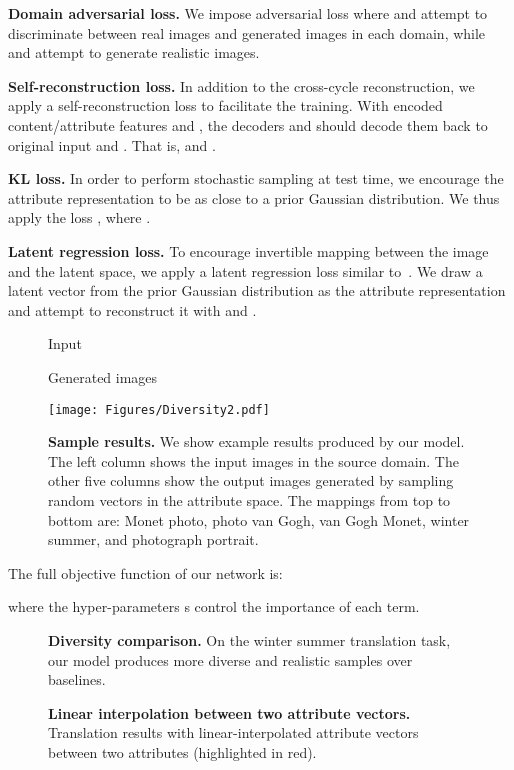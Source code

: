 \documentclass[runningheads]{llncs}
\newlength\figmargin
\newlength\secmargin
\newlength\eqmargin
\newcommand{\mpage}[2]
{
\begin{minipage}[t]{#1\linewidth}\centering
#2
\end{minipage}
}
\begin{document}
\noindent \textbf{Domain adversarial loss.}
We impose adversarial loss  where  and  attempt to discriminate between real images and generated images in each domain, while  and  attempt to generate realistic images.


\noindent \textbf{Self-reconstruction loss.}
In addition to the cross-cycle reconstruction, we apply a self-reconstruction loss  to facilitate the training. 
With encoded content/attribute features  and , the decoders  and  should decode them back to original input  and .
That is,  and .


\noindent \textbf{KL loss.}
In order to perform stochastic sampling at test time, we encourage the attribute representation to be as close to a prior Gaussian distribution.  
We thus apply the loss , where .

\noindent \textbf{Latent regression loss.}
To encourage invertible mapping between the image and the latent space, we apply a latent regression loss  similar to~\cite{zhu2017bicyclegan}. 
We draw a latent vector  from the prior Gaussian distribution as the attribute representation and attempt to reconstruct it with  and .


\begin{figure*}[t]
	\centering
     \mpage{0.16}{Input}\hfill\mpage{0.8}{Generated images}
\texttt{[image: Figures/Diversity2.pdf]}
\caption{\textbf{Sample results.} We show example results produced by our model. The left column shows the input images in the source domain. The other five columns show the output images generated by sampling random vectors in the attribute space. 
The mappings from top to bottom are: Monet  photo, photo  van Gogh, van Gogh   Monet, winter  summer, and photograph  portrait.
    }
    \label{figure:example}
    \vspace{\figmargin}
 \end{figure*}


The full objective function of our network is:
\vspace{\eqmargin}

\vspace{\eqmargin}
where the hyper-parameters s control the importance of each term. 






\begin{figure*}[t]
	\caption{\textbf{Diversity comparison.} On the winter  summer translation task, our model produces more diverse and realistic samples over baselines.
	}
	\label{figure:diversity}
    \vspace{-4mm}
\end{figure*}
\begin{figure*}[t]
	\centering
	\caption{\textbf{Linear interpolation between two attribute vectors.}  Translation results with linear-interpolated attribute vectors between two attributes (highlighted in red).
	}
	\label{figure:interpolation}
    \vspace{\figmargin}
\end{figure*}
\vspace{\secmargin}
\end{document}
